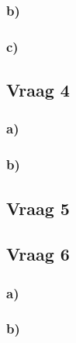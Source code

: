 \documentclass[lineaire_algebra_oplossingen.tex]{subfiles}
\begin{document}
\subsubsection*{b)}


\subsubsection*{c)}

\subsection{Vraag 4}
\subsubsection*{a)}


\subsubsection*{b)}

\subsection{Vraag 5}

\subsection{Vraag 6}
\subsubsection*{a)}


\subsubsection*{b)}
\end{document}
